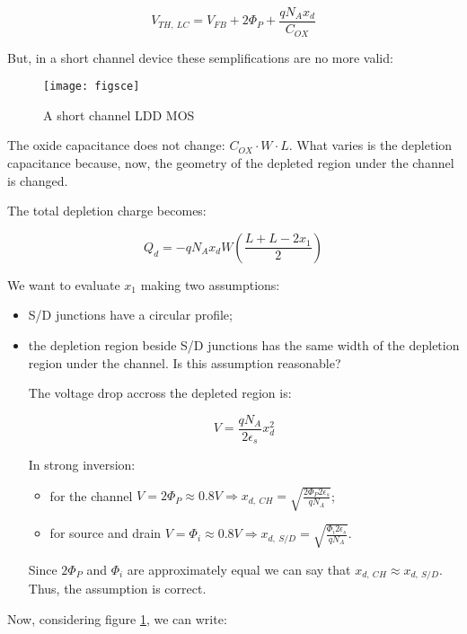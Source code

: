 \documentclass[a4paper, 12pt, twoside, openright]{report}
\begin{document}
	\begin{equation}
	V_{TH,\ LC} = V_{FB} + 2\Phi_P + \frac{q N_A x_d}{C_{OX}}
	\end{equation}

But, in a short channel device these semplifications are no more valid:

	\begin{figure}[H]
	\centering
	\texttt{[image: figsce]}
	\caption{A short channel LDD MOS}
	\label{figsce}
	\end{figure}

The oxide capacitance does not change: $C_{OX} \cdot W \cdot L$. What varies is the depletion capacitance because, now, the geometry of the depleted region under the channel is changed.

The total depletion charge becomes:

\begin{equation}
Q_d = -q N_A x_d W \left( \frac{L + L - 2x_1}{2} \right)
\end{equation}

We want to evaluate $x_{1}$ making two assumptions:

	\begin{itemize}
	\item S/D junctions have a circular profile;
	\item the depletion region beside S/D junctions has the same width of the depletion region under the channel. Is this assumption reasonable?
	
	The voltage drop accross the depleted region is:
	
	\begin{equation}
	V = \frac{q N_A}{2 \epsilon_s} x_d^2
	\end{equation}
	
	In strong inversion:
		\begin{itemize}
		\item for the channel $V = 2\Phi_P \approx 0.8 V \Rightarrow x_{d,\ CH} = \sqrt{\frac{2 \Phi_P 2 \epsilon_s}{q N_A}}$;
		\item for source and drain $V = \Phi_i \approx 0.8 V \Rightarrow x_{d,\ S/D} = \sqrt{\frac{\Phi_i 2 \epsilon_s}{q N_A}}$.
		\end{itemize}
	
	Since $2\Phi_P$ and $\Phi_i$ are approximately equal we can say that $x_{d,\ CH} \approx x_{d,\ S/D}$. Thus, the assumption is correct.
	\end{itemize}

Now, considering figure \ref{figsce}, we can write:
\end{document}
